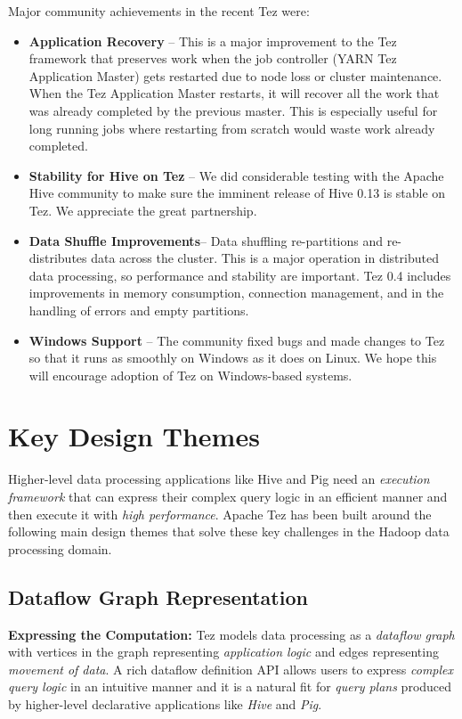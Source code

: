 \documentclass[twocolumn]{article}
\begin{document}
Major community achievements in the recent Tez  were:
\begin{itemize}
\item
  \textbf{Application Recovery} -- This is a major improvement to the
  Tez framework that preserves work when the job controller (YARN Tez
  Application Master) gets restarted due to node loss or cluster
  maintenance. When the Tez Application Master restarts, it will recover
  all the work that was already completed by the previous master. This
  is especially useful for long running jobs where restarting from
  scratch would waste work already completed.
\item
  \textbf{Stability for Hive on Tez} -- We did considerable testing with
  the Apache Hive community to make sure the imminent release of Hive
  0.13 is stable on Tez. We appreciate the great partnership.
\item
  \textbf{Data Shuffle Improvements}-- Data shuffling re-partitions and
  re-distributes data across the cluster. This is a major operation in
  distributed data processing, so performance and stability are
  important. Tez 0.4 includes improvements in memory consumption,
  connection management, and in the handling of errors and empty
  partitions.
\item
  \textbf{Windows Support} -- The community fixed bugs and made changes
  to Tez so that it runs as smoothly on Windows as it does on Linux. We
  hope this will encourage adoption of Tez on Windows-based systems.
\end{itemize}

\section{Key Design Themes}

Higher-level data processing applications like Hive and Pig need an
\textit{execution framework} that can express their complex query logic in an
efficient manner and then execute it with \textit{high performance}. 
Apache Tez has been built around the following main design themes that solve these
key challenges in the Hadoop data processing domain.

\subsection{Dataflow Graph Representation}
\textbf{Expressing the Computation:} Tez models data processing as a \emph{dataflow graph} with vertices in
the graph representing \emph{application logic} and edges representing
\emph{movement of data}. A rich dataflow definition API allows users to
express \emph{complex query logic} in an intuitive manner and it is a
natural fit for \emph{query plans} produced by higher-level declarative
applications like \emph{Hive} and \emph{Pig}. 
\end{document}

